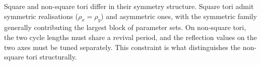 \par
Square and non-square tori differ in their symmetry structure.
Square tori admit symmetric realisations ($\rho_x = \rho_y$) and
asymmetric ones, with the symmetric family generally contributing
the largest block of parameter sets. On non-square tori, the two
cycle lengths must share a revival period, and the reflection
values on the two axes must be tuned separately. This constraint
is what distinguishes the non-square tori structurally.
